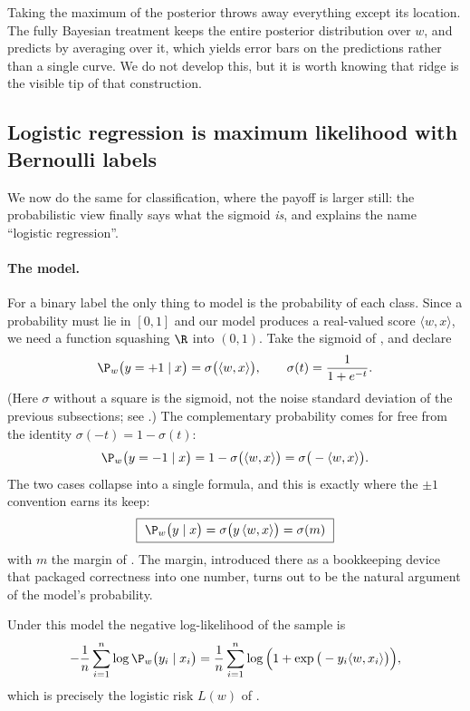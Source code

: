 \begin{remark}
Taking the maximum of the posterior throws away everything except its location. The
fully Bayesian treatment keeps the entire posterior distribution over $w$, and predicts
by averaging over it, which yields error bars on the predictions rather than a single
curve. We do not develop this, but it is worth knowing that ridge is the visible tip of
that construction.
\end{remark}


\subsection{Logistic regression is maximum likelihood with Bernoulli labels}
\label{subsec:mle-logistic}

We now do the same for classification, where the payoff is larger still: the
probabilistic view finally says what the sigmoid \emph{is}, and explains the name
``logistic regression''.

\paragraph{The model.}
For a binary label the only thing to model is the probability of each class. Since a
probability must lie in $[0,1]$ and our model produces a real-valued score $\langle w,
x\rangle$, we need a function squashing $\R$ into $(0,1)$. Take the sigmoid of
, and declare
\[
\P_w\big( y = +1 \mid x \big) = \sigma\big( \langle w, x \rangle \big) ,
\qquad
\sigma(t) = \frac{1}{1 + e^{-t}} .
\]
(Here $\sigma$ without a square is the sigmoid, not the noise standard deviation of the
previous subsections; see .) The complementary probability comes
for free from the identity $\sigma(-t) = 1 - \sigma(t)$:
\[
\P_w\big( y = -1 \mid x \big) = 1 - \sigma\big( \langle w, x\rangle \big)
= \sigma\big( - \langle w, x\rangle \big) .
\]
The two cases collapse into a single formula, and this is exactly where the $\pm 1$
convention earns its keep:
\[
\boxed{\ \P_w\big( y \mid x \big) = \sigma\big( y \, \langle w, x \rangle \big) = \sigma(m) \ }
\]
with $m$ the margin of . The margin, introduced there as a
bookkeeping device that packaged correctness into one number, turns out to be the
natural argument of the model's probability.

\begin{prop}
\label{prop:mle-logistic}
Under this model the negative log-likelihood of the sample is
\[
- \frac{1}{n} \sum_{i=1}^n \log \P_w\big( y_i \mid x_i \big)
= \frac{1}{n} \sum_{i=1}^n \log\Big( 1 + \exp\big( - y_i \langle w, x_i\rangle \big) \Big) ,
\]
which is precisely the logistic risk $L(w)$ of .
\end{prop}

